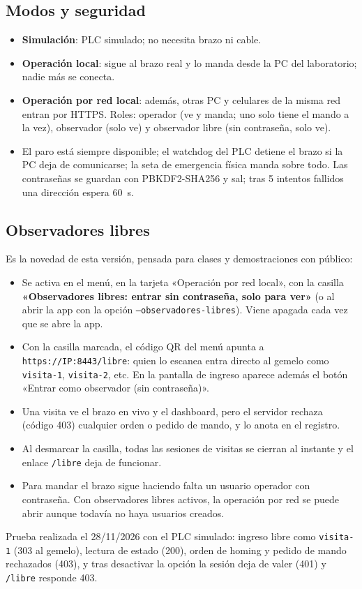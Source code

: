 \documentclass[11pt,a4paper]{article}
\newcommand{\codigo}[1]{\texttt{#1}}
\begin{document}
\subsection{Modos y seguridad}
\begin{itemize}
\item \textbf{Simulación}: PLC simulado; no necesita brazo ni cable.
\item \textbf{Operación local}: sigue al brazo real y lo manda desde la PC del laboratorio; nadie más se conecta.
\item \textbf{Operación por red local}: además, otras PC y celulares de la misma red entran por HTTPS. Roles: operador (ve y manda; uno solo tiene el mando a la vez), observador (solo ve) y observador libre (sin contraseña, solo ve).
\item El paro está siempre disponible; el watchdog del PLC detiene el brazo si la PC deja de comunicarse; la seta de emergencia física manda sobre todo. Las contraseñas se guardan con PBKDF2-SHA256 y sal; tras 5 intentos fallidos una dirección espera 60~s.
\end{itemize}

\subsection{Observadores libres}
Es la novedad de esta versión, pensada para clases y demostraciones con público:
\begin{itemize}
\item Se activa en el menú, en la tarjeta «Operación por red local», con la casilla \textbf{«Observadores libres: entrar sin contraseña, solo para ver»} (o al abrir la app con la opción \codigo{--observadores-libres}). Viene apagada cada vez que se abre la app.
\item Con la casilla marcada, el código QR del menú apunta a \codigo{https://IP:8443/libre}: quien lo escanea entra directo al gemelo como \codigo{visita-1}, \codigo{visita-2}, etc. En la pantalla de ingreso aparece además el botón «Entrar como observador (sin contraseña)».
\item Una visita ve el brazo en vivo y el dashboard, pero el servidor rechaza (código 403) cualquier orden o pedido de mando, y lo anota en el registro.
\item Al desmarcar la casilla, todas las sesiones de visitas se cierran al instante y el enlace \codigo{/libre} deja de funcionar.
\item Para mandar el brazo sigue haciendo falta un usuario operador con contraseña. Con observadores libres activos, la operación por red se puede abrir aunque todavía no haya usuarios creados.
\end{itemize}
Prueba realizada el 28/11/2026 con el PLC simulado: ingreso libre como \codigo{visita-1} (303 al gemelo),
lectura de estado (200), orden de homing y pedido de mando rechazados (403), y tras desactivar la opción la
sesión deja de valer (401) y \codigo{/libre} responde 403.
\end{document}
